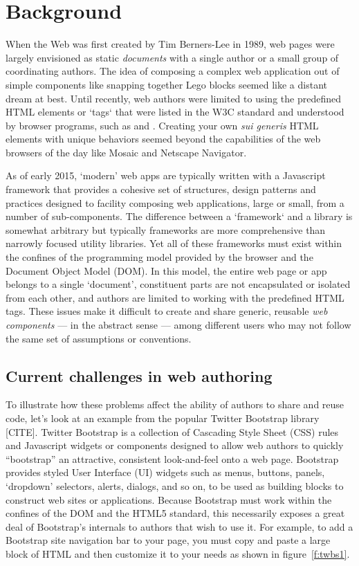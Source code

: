 \chapter{Background}
%

When the Web was first created by Tim Berners-Lee in 1989, web pages were largely envisioned as static \textit{documents} with a single author or a small group of coordinating authors. 
The idea of composing a complex web application out of simple components like snapping together Lego blocks seemed like a distant dream at best.
Until recently, web authors were limited to using the predefined HTML elements or `tags` that were listed in the W3C standard and understood by browser programs, such as  and . 
Creating your own \textit{sui generis} HTML elements with unique behaviors seemed beyond the capabilities of the web browsers of the day like Mosaic and Netscape Navigator.

As of early 2015, `modern' web apps are typically written with a Javascript framework that provides a cohesive set of structures, design patterns and practices designed to facility composing web applications, large or small, from a number of sub-components.
The difference between a `framework` and a library is somewhat arbitrary but typically frameworks are more comprehensive than narrowly focused utility libraries.
Yet all of these frameworks must exist within the confines of the programming model provided by the browser and the Document Object Model (DOM). 
In this model, the entire web page or app belongs to a single `document', constituent parts are not encapsulated or isolated from each other, and authors are limited to working with the predefined HTML tags.
These issues make it difficult to create and share generic, reusable \textit{web components} 
--- in the abstract sense --- 
among different users who may not follow the same set of assumptions or conventions.

\section{Current challenges in web authoring}
To illustrate how these problems affect the ability of authors to share and reuse code, let's look at an example from the popular Twitter Bootstrap library [CITE].
Twitter Bootstrap is a collection of Cascading Style Sheet (CSS) rules and Javascript widgets or components designed to allow web authors to quickly ``bootstrap'' an attractive, consistent look-and-feel onto a web page.
Bootstrap provides styled User Interface (UI) widgets such as menus, buttons, panels, `dropdown' selectors, alerts, dialogs, and so on, to be used as building blocks to construct web sites or applications.
Because Bootstrap must work within the confines of the DOM and the HTML5 standard, this necessarily exposes a great deal of Bootstrap's internals to authors that wish to use it. 
For example, to add a Bootstrap site navigation bar to your page, you must copy and paste a large block of HTML and then customize it to your needs as shown in figure~\ref{f:twbs1}.

